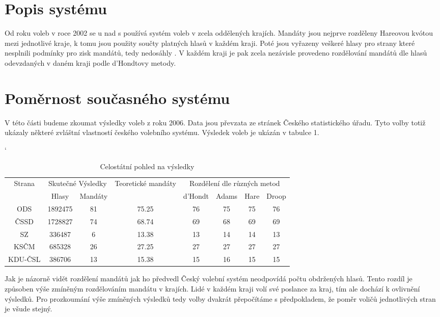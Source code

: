 \documentclass[12pt]{report}
\begin{document}
\section{Popis systému} Od roku voleb v roce 2002 se u nad s používá systém voleb v zcela oddělených krajích.
Mandáty jsou nejprve rozděleny Hareovou kvótou mezi jednotlivé kraje, k tomu jsou použity součty platných hlasů v každém kraji.
Poté jsou vyřazeny veškeré hlasy pro strany které nesplnili podmínky pro zisk mandátů, tedy nedosáhly .
V každém kraji je pak zcela nezávisle provedeno rozdělování mandátů dle hlasů odevzdaných v daném kraji podle d'Hondtovy metody.
\section{Poměrnost současného systému} V této části budeme zkoumat výsledky voleb z roku 2006.
Data jsou převzata ze stránek Českého statistického úřadu.\autocite{CSU} Tyto volby totiž ukázaly některé zvláštní vlastností českého volebního systému.
Výsledek voleb je ukázán v tabulce 1.
\begin{table}[p]
\catcode`
\begin{tabular}{|c|c|c|c|c|c|c|c|} \hline \multirow{2}{*}{Strana} & \multicolumn{2}{|c|}{Skutečné Výsledky} & \multirow{2}{*}{Teoretické mandáty} & \multicolumn{4}{|c|}{Rozdělení dle různých metod} \\
\cline{2-3} \cline{5-8} & Hlasy & Mandáty & & d'Hondt & Adams & Hare & Droop \\
\hline ODS & 1892475 & 81 & 75.25 & 76 & 75 & 75 & 76 \\
\hline ČSSD & 1728827 & 74 & 68.74 & 69 & 68 & 69 & 69 \\
\hline SZ & 336487 & 6 & 13.38 & 13 & 14 & 14 & 13 \\
\hline KSČM & 685328 & 26 & 27.25 & 27 & 27 & 27 & 27 \\
\hline KDU-ČSL & 386706 & 13 & 15.38 & 15 & 16 & 15 & 15 \\
\hline \end{tabular} \caption{Celostátní pohled na výsledky} \end{table} Jak je názorně vidět rozdělení mandátů jak ho předvedl Český volební systém neodpovídá počtu obdržených hlasů.
Tento rozdíl je způsoben výše zmíněným rozdělováním mandátu v krajích.
Lidé v každém kraji volí své poslance  za kraj, tím ale dochází k ovlivnění výsledků.
Pro prozkoumání výše zmíněných výsledků tedy volby dvakrát přepočítáme s předpokladem, že poměr voličů jednotlivých stran je všude stejný.
\end{document}
